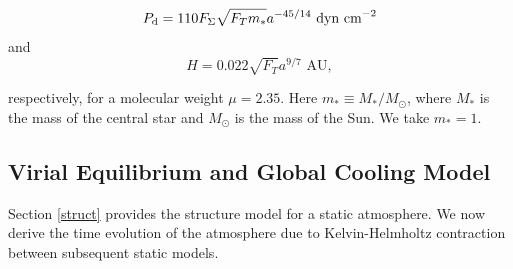 \documentclass[apj]{emulateapj}
\newcommand{\di}{_{\rm d}}
\begin{document}
\begin{equation}
\label{eq:Pd}
P\di=110  F_{\Sigma} \sqrt{F_T m_*} a^{-45/14} \,\, \text{dyn cm}^{-2}
\end{equation}
and
\begin{equation}
H=0.022 \sqrt{F_T} a^{9/7}\,\, \text{AU},
\end{equation}

\noindent respectively, for a molecular weight $\mu=2.35$. Here $m_* \equiv M_*/M_{\odot}$, where $M_*$ is the mass of the central star and $M_{\odot}$ is the mass of the Sun. We take $m_*=1$. 





\subsection{Virial Equilibrium and Global Cooling Model}
\label{cooling}

Section \ref{struct} provides the structure model for a static atmosphere. We now derive the time evolution of the atmosphere due to Kelvin-Helmholtz contraction between subsequent static models. 
\end{document}

